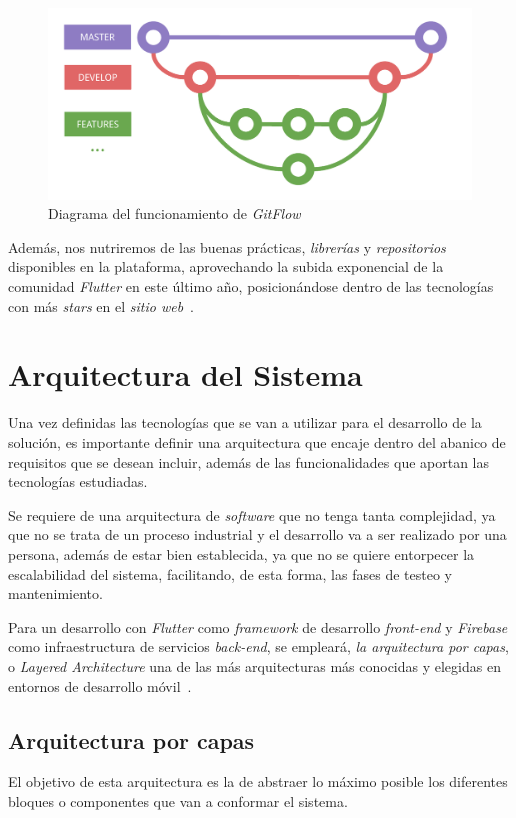 \begin{figure}[H]
    \centering
    \includegraphics[scale=0.6]{images/gitflow1.pdf}
    \caption{Diagrama del funcionamiento de \textit{GitFlow}}
    \label{fig:gitflow1}
  \end{figure}

Además, nos nutriremos de las buenas prácticas, \textit{librerías} y \textit{repositorios} disponibles en la plataforma,
aprovechando la subida exponencial de la comunidad \textit{Flutter} en este último año, posicionándose
dentro de las tecnologías con más \textit{stars} en el \textit{sitio web}~\cite{gittracker}.

\section{Arquitectura del Sistema}
Una vez definidas las tecnologías que se van a utilizar para el desarrollo de la solución, es importante definir una 
arquitectura que encaje dentro del abanico de requisitos que se desean incluir, además de las funcionalidades que
aportan las tecnologías estudiadas.

Se requiere de una arquitectura de \textit{software} que no tenga tanta complejidad, ya que no se trata de un
proceso industrial y el desarrollo va a ser realizado por una persona, además de estar bien establecida, ya que
no se quiere entorpecer la escalabilidad del sistema, facilitando, de esta forma, las fases de testeo y mantenimiento.

Para un desarrollo con \textit{Flutter} como \textit{framework} de desarrollo \textit{front-end} y \textit{Firebase}
como infraestructura de servicios \textit{back-end}, se empleará, \textit{la arquitectura por capas}, o 
\textit{Layered Architecture} 
una de las más arquitecturas más conocidas y elegidas en entornos de desarrollo móvil~\cite{7053865}.

\subsection{Arquitectura por capas}
El objetivo de esta arquitectura es la de abstraer lo máximo posible los diferentes bloques o componentes que van a
conformar el sistema. 

